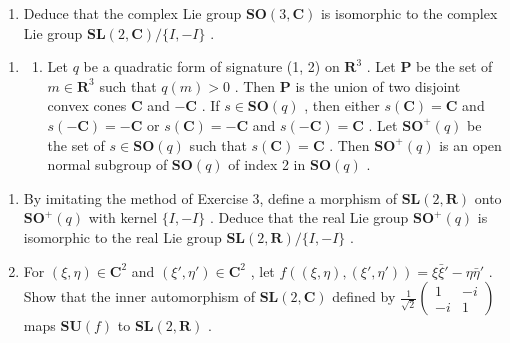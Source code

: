 \begin{enumerate}
\def\labelenumi{(\alph{enumi})}
\setcounter{enumi}{2}
\tightlist
\item
  Deduce that the complex Lie group \(\mathbf{SO}(3, \mathbf{C})\) is isomorphic to the complex Lie group \(\mathbf{SL}(2, \mathbf{C}) / \{I, -I\}\) .
\end{enumerate}

\begin{enumerate}
\def\labelenumi{\arabic{enumi}.}
\setcounter{enumi}{3}
\tightlist
\item
  \begin{enumerate}
  \def\labelenumii{(\alph{enumii})}
  \tightlist
  \item
    Let \(q\) be a quadratic form of signature (1, 2) on \(\mathbf{R}^3\) . Let \(\mathbf{P}\) be the set of \(m \in \mathbf{R}^3\) such that \(q(m) > 0\) . Then \(\mathbf{P}\) is the union of two disjoint convex cones \(\mathbf{C}\) and \(-\mathbf{C}\) . If \(s \in \mathbf{SO}(q)\) , then either \(s(\mathbf{C}) = \mathbf{C}\) and \(s(-\mathbf{C}) = -\mathbf{C}\) or \(s(\mathbf{C}) = -\mathbf{C}\) and \(s(-\mathbf{C}) = \mathbf{C}\) . Let \(\mathbf{SO}^{+}(q)\) be the set of \(s \in \mathbf{SO}(q)\) such that \(s(\mathbf{C}) = \mathbf{C}\) . Then \(\mathbf{SO}^{+}(q)\) is an open normal subgroup of \(\mathbf{SO}(q)\) of index 2 in \(\mathbf{SO}(q)\) .
  \end{enumerate}
\end{enumerate}

\begin{enumerate}
\def\labelenumi{(\alph{enumi})}
\setcounter{enumi}{1}
\item
  By imitating the method of Exercise 3, define a morphism of \(\mathbf{SL}(2,\mathbf{R})\) onto \(\mathbf{SO}^{+}(q)\) with kernel \(\{I, - I\}\) . Deduce that the real Lie group \(\mathbf{SO}^{+}(q)\) is isomorphic to the real Lie group \(\mathbf{SL}(2,\mathbf{R}) / \{I, - I\}\) .
\item
  For \((\xi, \eta) \in \mathbf{C}^2\) and \((\xi', \eta') \in \mathbf{C}^2\) , let \(f((\xi, \eta), (\xi', \eta')) = \xi \bar{\xi}' - \eta \bar{\eta}'\) . Show that the inner automorphism of \(\mathbf{SL}(2, \mathbf{C})\) defined by \(\frac{1}{\sqrt{2}} \begin{pmatrix} 1 & -i \\ -i & 1 \end{pmatrix}\) maps \(\mathbf{SU}(f)\) to \(\mathbf{SL}(2, \mathbf{R})\) .
\end{enumerate}

